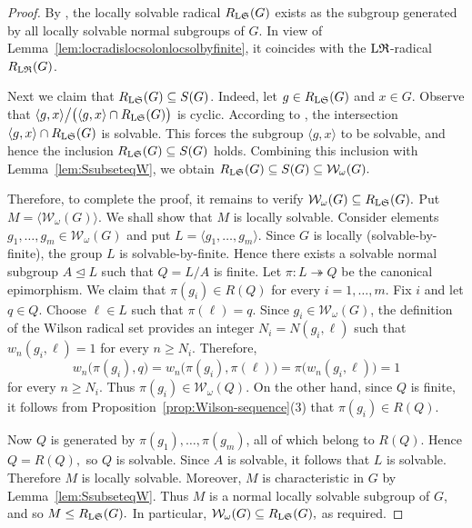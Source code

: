 \documentclass[11pt, reqno]{amsart}
\numberwithin{equation}{section}
\theoremstyle{definition}
\newcommand{\LS}{\textup{L}\mathfrak{S}}
\numberwithin{equation}{section}
\begin{document}
\begin{proof}
By \cite[Lemma~4.6]{CNH2025}, the locally solvable radical $R_{\LS}(G)$ exists as the subgroup generated by all locally solvable normal subgroups of $G$. In view of Lemma~\ref{lem:locradislocsolonlocsolbyfinite}, it coincides with the $\textup{L}\mathfrak{R}$-radical $R_{\textup{L}\mathfrak{R}}(G)$. 

Next we claim that $R_{\LS}(G) \subseteq S(G)$. Indeed,
let $g \in R_{\LS}(G)$ and $x \in G$.  Observe that
$\langle g,x\rangle
\big/
\bigl(\langle g,x\rangle\cap R_{\LS}(G)\bigr)$
is cyclic. According to \cite[Lemma 2.5]{CNH2025}, the intersection $\langle g, x \rangle \cap R_{\LS}(G)$ is solvable.  This forces  the subgroup $ \langle g, x \rangle $ to be solvable, and hence the inclusion $ R_{\LS}(G) \subseteq S(G) $ holds.   Combining this inclusion with
Lemma~\ref{lem:SsubseteqW}, we obtain
$R_{\LS}(G)
\subseteq
S(G)
\subseteq
\mathcal{W}_{\omega}(G).$

Therefore, to complete the proof, it remains to verify $\mathcal{W}_{\omega}(G) \subseteq R_{\LS}(G).$
Put
$M=\bigl\langle \mathcal W_\omega(G)\bigr\rangle.$
We shall show that $M$ is locally solvable. Consider elements $g_1,\ldots,g_m\in\mathcal W_\omega(G)$ and put
$L=\langle g_1,\ldots,g_m\rangle.$ Since $G$ is locally (solvable-by-finite), the group $L$ is solvable-by-finite. Hence there exists a solvable normal subgroup $A\trianglelefteq L$ such that $Q=L/A$ is finite. Let $\pi\colon L\twoheadrightarrow Q$ be the canonical epimorphism. We claim that $\pi(g_i)\in R(Q)$ for every $i=1,\ldots,m$. Fix $i$ and let $q\in Q$. Choose $\ell\in L$ such that $\pi(\ell)=q$. Since $g_i\in\mathcal W_\omega(G)$, the definition of the Wilson radical set provides an integer $N_i=N(g_i,\ell)$ such that $w_n(g_i,\ell)=1$ for every $n\geq N_i$. Therefore, $$w_n\bigl(\pi(g_i),q\bigr) = w_n\bigl(\pi(g_i),\pi(\ell)\bigr) = \pi\bigl(w_n(g_i,\ell)\bigr) = 1$$ for every $n\geq N_i$. 
Thus $\pi(g_i)\in\mathcal W_\omega(Q).$ 
On the other hand, since $Q$ is finite, it follows from Proposition~\ref{prop:Wilson-sequence}\textup{(3)} that $\pi(g_i)\in R(Q).$

Now $Q$ is generated by $\pi(g_1),\ldots,\pi(g_m)$, all of which belong to $R(Q)$. Hence $Q=R(Q),$ so $Q$ is solvable. Since $A$ is solvable, it follows that $L$ is solvable. Therefore $M$ is locally solvable. Moreover, 
$M$ is characteristic in $G$ by Lemma~\ref{lem:SsubseteqW}. Thus $M$ is a normal locally solvable subgroup of $G$, and so $M\leq R_{\LS}(G).$ In particular, $\mathcal W_\omega(G)\subseteq R_{\LS}(G),$ as required.
\end{proof}
\end{document}
